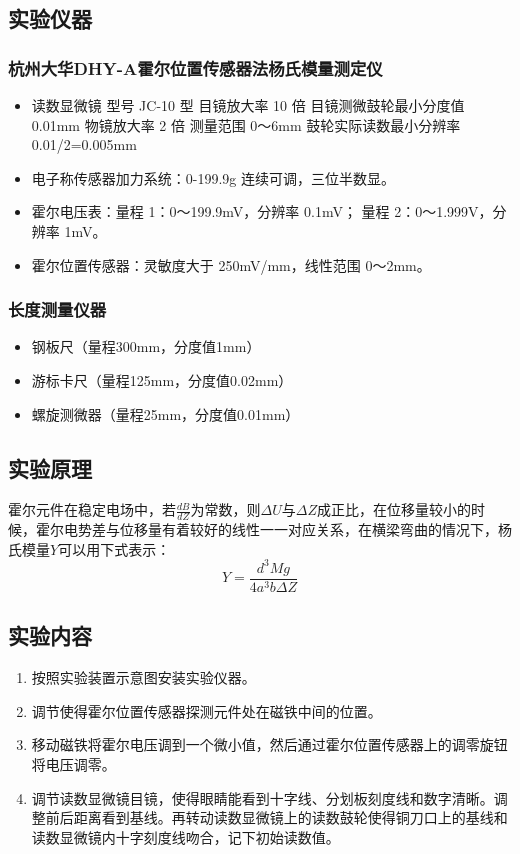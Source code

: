 \documentclass[zihao=5, UTF8]{article}
\theoremstyle{MyLineTheoremStyle} %
\theoremstyle{MyBlockTheoremStyle} %
\theoremstyle{MySubsubsectionStyle} %
\begin{document}
\subsection{实验仪器}
\subsubsection{杭州大华DHY-A霍尔位置传感器法杨氏模量测定仪}
\begin{itemize}
    \item 读数显微镜 型号 JC-10 型
          目镜放大率 10 倍
          目镜测微鼓轮最小分度值 0.01mm
          物镜放大率 2 倍
          测量范围 0～6mm
          鼓轮实际读数最小分辨率 0.01/2=0.005mm
    \item 电子称传感器加力系统：0-199.9g 连续可调，三位半数显。
    \item 霍尔电压表：量程 1：0～199.9mV，分辨率 0.1mV；
                       量程 2：0～1.999V，分辨率 1mV。
    \item 霍尔位置传感器：灵敏度大于 250mV/mm，线性范围 0～2mm。
\end{itemize}
\subsubsection{长度测量仪器}
\begin{itemize}
    \item 钢板尺（量程300mm，分度值1mm）
    \item 游标卡尺（量程125mm，分度值0.02mm）
    \item 螺旋测微器（量程25mm，分度值0.01mm）
\end{itemize}

\subsection{实验原理}
霍尔元件在稳定电场中，若$\frac{dB}{dZ}$为常数，则$\Delta U$与$\Delta Z$成正比，在位移量较小的时候，霍尔电势差与位移量有着较好的线性一一对应关系，在横梁弯曲的情况下，杨氏模量$Y$可以用下式表示：
\begin{equation}
    Y = \frac{d^3 Mg}{4a^3 b\Delta Z}
\end{equation}

\subsection{实验内容}
\begin{enumerate}
    \item 按照实验装置示意图安装实验仪器。
    \item 调节使得霍尔位置传感器探测元件处在磁铁中间的位置。
    \item 移动磁铁将霍尔电压调到一个微小值，然后通过霍尔位置传感器上的调零旋钮将电压调零。
    \item 调节读数显微镜目镜，使得眼睛能看到十字线、分划板刻度线和数字清晰。调整前后距离看到基线。再转动读数显微镜上的读数鼓轮使得铜刀口上的基线和读数显微镜内十字刻度线吻合，记下初始读数值。
\end{enumerate}
\end{document}
